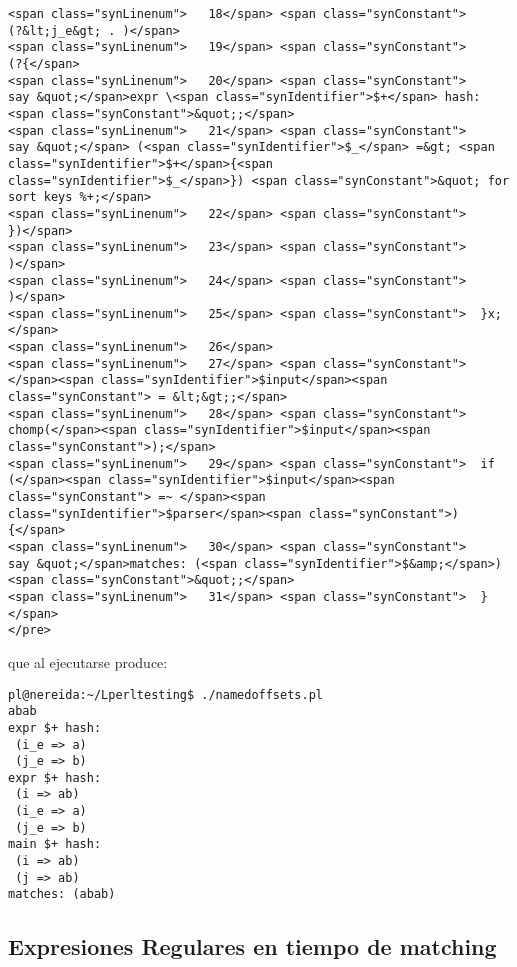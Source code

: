 \begin{verbatim}
<span class="synLinenum">   18</span> <span class="synConstant">              (?&lt;j_e&gt; . )</span>
<span class="synLinenum">   19</span> <span class="synConstant">                (?{</span>
<span class="synLinenum">   20</span> <span class="synConstant">                    say &quot;</span>expr \<span class="synIdentifier">$+</span> hash:<span class="synConstant">&quot;;</span>
<span class="synLinenum">   21</span> <span class="synConstant">                    say &quot;</span> (<span class="synIdentifier">$_</span> =&gt; <span class="synIdentifier">$+</span>{<span class="synIdentifier">$_</span>}) <span class="synConstant">&quot; for sort keys %+;</span>
<span class="synLinenum">   22</span> <span class="synConstant">                })</span>
<span class="synLinenum">   23</span> <span class="synConstant">          )</span>
<span class="synLinenum">   24</span> <span class="synConstant">      )</span>
<span class="synLinenum">   25</span> <span class="synConstant">  }x;</span>
<span class="synLinenum">   26</span> 
<span class="synLinenum">   27</span> <span class="synConstant">  </span><span class="synIdentifier">$input</span><span class="synConstant"> = &lt;&gt;;</span>
<span class="synLinenum">   28</span> <span class="synConstant">  chomp(</span><span class="synIdentifier">$input</span><span class="synConstant">);</span>
<span class="synLinenum">   29</span> <span class="synConstant">  if (</span><span class="synIdentifier">$input</span><span class="synConstant"> =~ </span><span class="synIdentifier">$parser</span><span class="synConstant">) {</span>
<span class="synLinenum">   30</span> <span class="synConstant">    say &quot;</span>matches: (<span class="synIdentifier">$&amp;</span>)<span class="synConstant">&quot;;</span>
<span class="synLinenum">   31</span> <span class="synConstant">  }</span>
</pre>

\end{verbatim}

que al ejecutarse produce:

\begin{verbatim}
pl@nereida:~/Lperltesting$ ./namedoffsets.pl
abab
expr $+ hash:
 (i_e => a)
 (j_e => b)
expr $+ hash:
 (i => ab)
 (i_e => a)
 (j_e => b)
main $+ hash:
 (i => ab)
 (j => ab)
matches: (abab)
\end{verbatim}

\subsection{Expresiones Regulares en tiempo de matching}
\label{subsection:tiempodematching}

